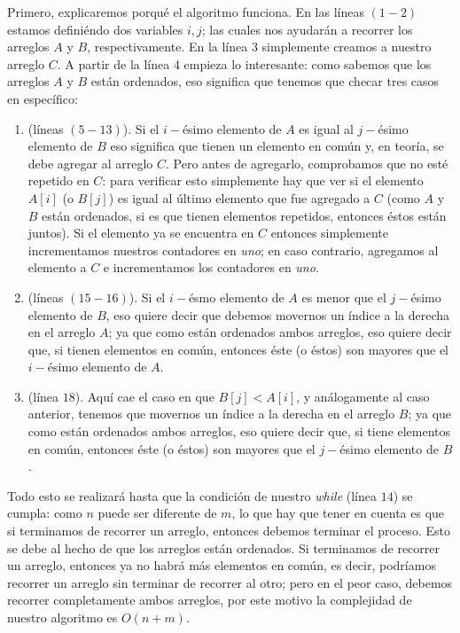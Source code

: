 \documentclass[letterpaper,11pt]{article}
\begin{document}
\begin{enumerate}
    Primero, explicaremos porqué el algoritmo funciona. En las líneas $(1 - 2)$ 
    estamos definiéndo dos variables $i, j$; las cuales nos ayudarán a recorrer
    los arreglos $A$ y $B$, respectivamente. En la línea $3$ simplemente creamos 
    a nuestro arreglo $C$. A partir de la línea $4$ empieza lo interesante: como
    sabemos que los arreglos $A$ y $B$ están ordenados, eso significa que 
    tenemos que checar tres casos en específico:
    \begin{enumerate}
        \item (líneas $(5 - 13)$). Si el $i-$ésimo elemento de $A$ es igual al 
        $j-$ésimo elemento de $B$ eso significa que tienen un elemento en común 
        y, en teoría, se debe agregar al arreglo $C$. Pero antes de agregarlo,
        comprobamos que no esté repetido en $C$: para verificar esto simplemente
        hay que ver si el elemento $A[i]$ (o $B[j]$) es igual al último elemento 
        que fue agregado a $C$ (como $A$ y $B$ están ordenados, si es que tienen 
        elementos repetidos, entonces éstos están juntos). Si el elemento ya se 
        encuentra en $C$ entonces simplemente incrementamos nuestros contadores 
        en \textit{uno}; en caso contrario, agregamos al elemento a $C$ e 
        incrementamos los contadores en \textit{uno}.

        \item (líneas $(15 - 16)$). Si el $i-$ésmo elemento de $A$ es menor que 
        el $j-$ésimo elemento de $B$, eso quiere decir que debemos movernos un 
        índice a la derecha en el arreglo $A$; ya que como están ordenados ambos 
        arreglos, eso quiere decir que, si tienen elementos en común, entonces 
        éste (o éstos) son mayores que el $i-$ésimo elemento de $A$.

        \item (línea $18$). Aquí cae el caso en que $B[j] < A[i]$, y 
        análogamente al caso anterior, tenemos que movernos un índice a la 
        derecha en el arreglo $B$; ya que como están ordenados ambos arreglos, 
        eso quiere decir que, si tiene elementos en común, entonces éste (o 
        éstos) son mayores que el $j-$ésimo elemento de $B$. 
    \end{enumerate} 

    Todo esto se realizará hasta que la condición de nuestro \textit{while} 
    (línea $14$) se cumpla: como $n$ puede ser diferente de $m$, lo que hay 
    que tener en cuenta es que si terminamos de recorrer un arreglo, entonces 
    debemos terminar el proceso. Esto se debe al hecho de que los arreglos
    están ordenados. Si terminamos de recorrer un arreglo, entonces ya no 
    habrá más elementos en común, es decir, podríamos recorrer un arreglo sin 
    terminar de recorrer al otro; pero en el peor caso, debemos recorrer 
    completamente ambos arreglos, por este motivo la complejidad de nuestro 
    algoritmo es $O(n + m)$. 


\end{enumerate}
\end{document}
